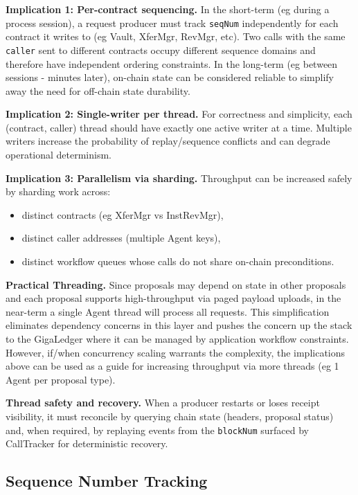 \documentclass[10pt]{article}
\begin{document}
\textbf{Implication 1: Per-contract sequencing.}
In the short-term (eg during a process session), a request producer must track \texttt{seqNum} independently for each contract it writes to (eg Vault, XferMgr, RevMgr, etc). Two calls with the same \texttt{caller} sent to different contracts occupy different sequence domains and therefore have independent ordering constraints. In the long-term (eg between sessions - minutes later), on-chain state can be considered reliable to simplify away the need for off-chain state durability.

\textbf{Implication 2: Single-writer per thread.}
For correctness and simplicity, each (contract, caller) thread should have exactly one active writer at a time. Multiple writers increase the probability of replay/sequence conflicts and can degrade operational determinism.

\textbf{Implication 3: Parallelism via sharding.}
Throughput can be increased safely by sharding work across:
\begin{itemize}
    \item distinct contracts (eg XferMgr vs InstRevMgr),
    \item distinct caller addresses (multiple Agent keys),
    \item distinct workflow queues whose calls do not share on-chain preconditions.
\end{itemize}

\textbf{Practical Threading.}
Since proposals may depend on state in other proposals and each proposal supports high-throughput via paged payload uploads, in the near-term a single Agent thread will process all requests. This simplification eliminates dependency concerns in this layer and pushes the concern up the stack to the GigaLedger where it can be managed by application workflow constraints. However, if/when concurrency scaling warrants the complexity, the implications above can be used as a guide for increasing throughput via more threads (eg 1 Agent per proposal type).

\textbf{Thread safety and recovery.}
When a producer restarts or loses receipt visibility, it must reconcile by querying chain state (headers, proposal status) and, when required, by replaying events from the \texttt{blockNum} surfaced by CallTracker for deterministic recovery.

\clearpage
\subsection{Sequence Number Tracking}
\end{document}
